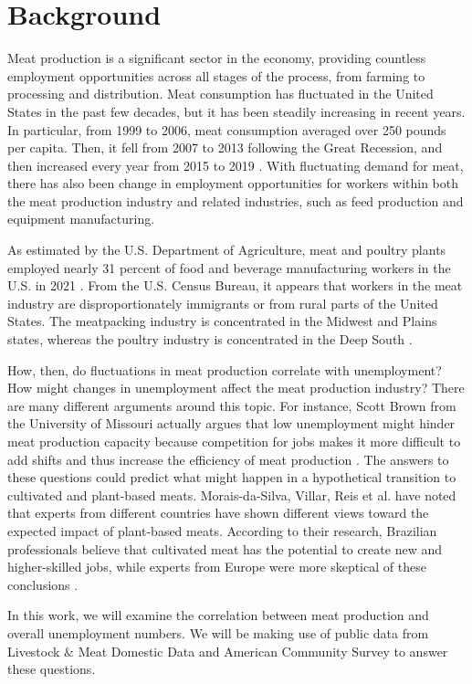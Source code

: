 \documentclass[12pt]{article}
\begin{document}
\section{Background}
Meat production is a significant sector in the economy, providing countless employment opportunities across all stages of the process, from farming to processing and distribution. Meat consumption has fluctuated in the United States in the past few decades, but it has been steadily increasing in recent years. In particular, from 1999 to 2006, meat consumption averaged over 250 pounds per capita. Then, it fell from 2007 to 2013 following the Great Recession, and then increased every year from 2015 to 2019 \cite{Illinois}. With fluctuating demand for meat, there has also been change in employment opportunities for workers within both the meat production industry and related industries, such as feed production and equipment manufacturing. 

As estimated by the U.S. Department of Agriculture, meat and poultry plants employed nearly 31 percent of food and beverage manufacturing workers in the U.S. in 2021 \cite{31_Percent}. From the U.S. Census Bureau, it appears that workers in the meat industry are disproportionately immigrants or from rural parts of the United States. The meatpacking industry is concentrated in the Midwest and Plains states, whereas the poultry industry is concentrated in the Deep South \cite{Economic_Policy_Institute}.

How, then, do fluctuations in meat production correlate with unemployment? How might changes in unemployment affect the meat production industry? There are many different arguments around this topic. For instance, Scott Brown from the University of Missouri actually argues that low unemployment might hinder meat production capacity because competition for jobs makes it more difficult to add shifts and thus increase the efficiency of meat production \cite{Brownfield}. The answers to these questions could predict what might happen in a hypothetical transition to cultivated and plant-based meats. Morais-da-Silva, Villar, Reis et al. have noted that experts from different countries have shown different views toward the expected impact of plant-based meats. According to their research, Brazilian professionals believe that cultivated meat has the potential to create new and higher-skilled jobs, while experts from Europe were more skeptical of these conclusions \cite{Plant_Based}.

In this work, we will examine the correlation between meat production and overall unemployment numbers. We will be making use of public data from Livestock $\&$ Meat Domestic Data and American Community Survey to answer these questions.
\end{document}
